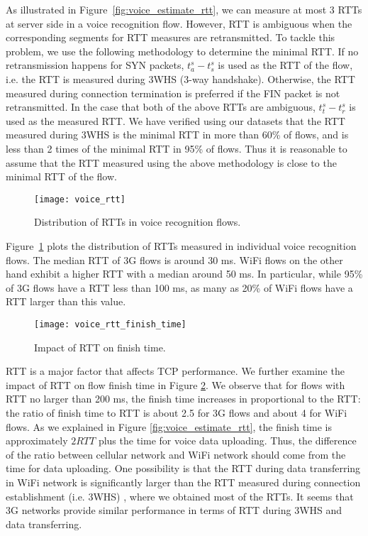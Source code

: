 As illustrated in Figure~\ref{fig:voice_estimate_rtt}, we can measure at most 3 RTTs at server side in a voice recognition flow. However, RTT is ambiguous when the corresponding segments for RTT measures are retransmitted. To tackle this problem, we use the following methodology to determine the minimal RTT. If no retransmission happens for SYN packets, $t^s_a - t^s_s$ is used as the RTT of the flow, i.e. the RTT is measured during 3WHS (3-way handshake). Otherwise, the RTT measured during connection termination is preferred if the FIN packet is not retransmitted. In the case that both of the above RTTs are ambiguous, $t^s_t - t^s_r$ is used as the measured RTT. We have verified using our datasets that the RTT measured during 3WHS is the minimal RTT in more than 60\% of flows, and is less than 2 times of the minimal RTT in 95\% of flows. Thus it is reasonable to assume that the RTT measured using the above methodology is close to the minimal RTT of the flow.

\begin{figure}[th]
\centering
	\texttt{[image: voice\_rtt]}
\caption{Distribution of RTTs in voice recognition flows.}
\label{fig:voice_rtt}
\end{figure}

Figure~\ref{fig:voice_rtt} plots the distribution of RTTs measured in individual voice recognition flows. The median RTT of 3G flows is around 30 ms. WiFi flows on the other hand exhibit a higher RTT with a median around 50 ms. In particular, while 95\% of 3G flows have a RTT less than 100 ms, as many as 20\% of WiFi flows have a RTT larger than this value. 

\begin{figure}[th]
\centering
	\texttt{[image: voice\_rtt\_finish\_time]}
\caption{Impact of RTT on finish time.}
\label{fig:v_rtt_time}
\end{figure}

RTT is a major factor that affects TCP performance. We further examine the impact of RTT on flow finish time in Figure \ref{fig:v_rtt_time}. We observe that for flows with RTT no larger than 200 ms, the finish time increases in proportional to the RTT: the ratio of finish time to RTT is about 2.5 for 3G flows and about 4 for WiFi flows. As we explained in Figure \ref{fig:voice_estimate_rtt}, the finish time is approximately $2RTT$ plus the time for voice data uploading. Thus, the difference of the ratio between cellular network and WiFi network should come from the time for data uploading. One possibility is that the RTT during data transferring in WiFi network is significantly larger than the RTT measured during connection establishment (i.e. 3WHS) \cite{UM-CS-2012-022}, where we obtained most of the RTTs. It seems that 3G networks provide similar performance in terms of RTT during 3WHS and data transferring. 

